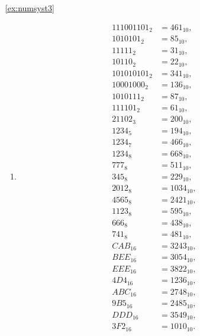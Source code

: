 \begin{enumerate}
\item[\ref{ex:numsyst3}]
\begin{enumerate}
\item
\begin{align*}
111001101_2 &= 461_{10}, \\
1010101_2 &= 85_{10}, \\
11111_2 &= 31_{10}, \\
10110_2 &= 22_{10}, \\
101010101_2 &= 341_{10}, \\
10001000_2 &= 136_{10}, \\
1010111_2 &= 87_{10}, \\
111101_2 &= 61_{10}, \\
21102_3 &= 200_{10}, \\
1234_5 &= 194_{10}, \\
1234_7 &= 466_{10}, \\
1234_8 &= 668_{10}, \\
777_8 &= 511_{10}, \\
345_8 &= 229_{10}, \\ 
2012_8 &= 1034_{10}, \\
4565_8 &= 2421_{10}, \\
1123_8 &= 595_{10}, \\
666_8 &= 438_{10}, \\
741_8 &= 481_{10}, \\
CAB_{16} &= 3243_{10}, \\ 
BEE_{16} &= 3054_{10}, \\
EEE_{16} &= 3822_{10}, \\
4D4_{16} &= 1236_{10}, \\
ABC_{16} &= 2748_{10}, \\
9B5_{16} &= 2485_{10}, \\
DDD_{16} &=3549_{10}, \\
3F2_{16} &= 1010_{10}.
\end{align*}


\end{enumerate}
\end{enumerate}
